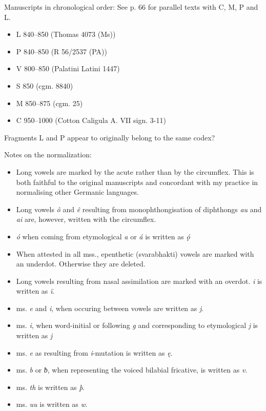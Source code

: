 
Manuscripts in chronological order:
  See p. 66 for parallel texts with C, M, P and L.

\begin{itemize}
  \item L 840–850 (Thomas 4073 (Ms))
  \item P 840–850 (R 56/2537 (PA))
  \item V 800–850 (Palatini Latini 1447)
  \item S 850 (cgm. 8840)
  \item M 850–875 (cgm. 25)
  \item C 950–1000 (Cotton Caligula A. VII sign. 3-11)
\end{itemize}

Fragments L and P appear to originally belong to the same codex?


Notes on the normalization:
  \begin{itemize}
    \item Long vowels are marked by the acute rather than by the circumflex. This is both faithful to the original manuscripts and concordant with my practice in normalising other Germanic languages.
    \item Long vowels \emph{ô} and \emph{ê} resulting from monophthongisation of diphthongs \emph{au} and \emph{ai} are, however, written with the circumflex.
    \item \emph{ó} when coming from etymological \emph{a} or \emph{á} is written as \emph{ǫ́}
    \item When attested in all mss., epenthetic (svarabhakti) vowels are marked with an underdot. Otherwise they are deleted.
    \item Long vowels resulting from nasal assimilation are marked with an overdot. \emph{i} is written as \emph{ï}.
    \item ms. \emph{e} and \emph{i}, when occuring between vowels are written as \emph{j}.
    \item ms. \emph{i}, when word-initial or following \emph{g} and corresponding to etymological \emph{j} is written as \emph{j}
    \item ms. \emph{e} as resulting from \emph{i}-mutation is written as \emph{ę}.
    \item ms. \emph{b} or \emph{ƀ}, when representing the voiced bilabial fricative, is written as \emph{v}.
    \item ms. \emph{th} is written as \emph{þ}.
    \item ms. \emph{uu} is written as \emph{w}.
  \end{itemize}

